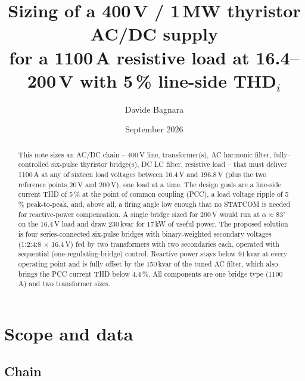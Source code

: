\documentclass[11pt,a4paper]{article}
\title{Sizing of a 400\,V / 1\,MW thyristor AC/DC supply\\
\large for a 1100\,A resistive load at 16.4--200\,V with 5\,\% line-side THD$_i$}
\author{Davide Bagnara}
\date{September 2026}
\begin{document}
\maketitle

\begin{abstract}
This note sizes an AC/DC chain -- 400\,V line, transformer(s), AC harmonic filter, fully-controlled six-pulse thyristor bridge(s), DC LC filter, resistive load -- that must deliver 1100\,A at any of sixteen load voltages between 16.4\,V and 196.8\,V (plus the two reference points 20\,V and 200\,V), one load at a time. The design goals are a line-side current THD of 5\,\% at the point of common coupling (PCC), a load voltage ripple of 5\,\% peak-to-peak, and, above all, a firing angle low enough that no STATCOM is needed for reactive-power compensation. A single bridge sized for 200\,V would run at $\alpha \approx 83^\circ$ on the 16.4\,V load and draw 230\,kvar for 17\,kW of useful power. The proposed solution is four series-connected six-pulse bridges with binary-weighted secondary voltages (1:2:4:8 $\times$ 16.4\,V) fed by two transformers with two secondaries each, operated with sequential (one-regulating-bridge) control. Reactive power stays below 91\,kvar at every operating point and is fully offset by the 150\,kvar of the tuned AC filter, which also brings the PCC current THD below 4.4\,\%. All components are one bridge type (1100\,A) and two transformer sizes.
\end{abstract}

\tableofcontents

\section{Scope and data}

\subsection{Chain}
\end{document}
